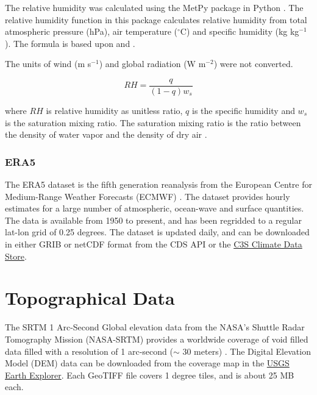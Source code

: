 The relative humidity was calculated using the MetPy package in Python \parencite{metpy}. The relative humidity function in this package calculates relative humidity from total atmospheric pressure (hPa), air temperature ($^{\circ}$C) and specific humidity (kg kg$^{-1}$). The formula is based upon \cite{wallace1977atmospheric} and \cite{salby_fundamentals_1996}. 

The units of wind (m s$^{-1}$) and global radiation (W m$^{-2}$) were not converted. 

\begin{equation}
    RH = \frac{q}{(1 - q) w_{s}}
\end{equation}

where $RH$ is relative humidity as unitless ratio,  $q$ is the specific humidity and $w_{s}$ is the saturation mixing ratio. The saturation mixing ratio is the ratio between the density of water vapor and the density of dry air \parencite{kasahara_weather_2003}. 


\subsubsection{ERA5}

The ERA5 dataset is the fifth generation reanalysis from the European Centre for Medium-Range Weather Forecasts (ECMWF) \parencite{hersbach18}. The dataset provides hourly estimates for a large number of atmospheric, ocean-wave and surface quantities. The data is available from 1950 to present, and has been regridded to a regular lat-lon grid of 0.25 degrees. The dataset is updated daily, and can be downloaded in either GRIB or netCDF format from the CDS API or the \href{https://cds.climate.copernicus.eu/cdsapp#!/dataset/reanalysis-era5-single-levels?tab=overview}{C3S Climate Data Store}.

\section{Topographical Data}

The SRTM 1 Arc-Second Global elevation data from the NASA's Shuttle Radar Tomography Mission (NASA-SRTM) provides a worldwide coverage of void filled data filled with a resolution of 1 arc-second ($\sim$ 30 meters) \parencite{earth_resources_observation_and_science_eros_center_shuttle_2017}. The Digital Elevation Model (DEM) data can be downloaded from the coverage map in the  \href{https://earthexplorer.usgs.gov/}{USGS Earth Explorer}. Each GeoTIFF file covers 1 degree tiles, and is about 25 MB each.

